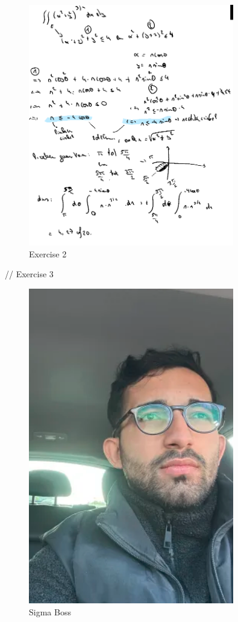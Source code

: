 \documentclass[a4paper]{article}
\begin{document}
\begin{figure}[H]
	\centering
	\includegraphics[width=0.8\textwidth]{assets/bord_5_ex_2.png}
	\caption{Exercise 2}
	\label{fig:bord_5_ex_2}
\end{figure}

// Exercise 3



\begin{figure}[h]
	\centering
	\includegraphics[width=0.8\textwidth]{assets/ilkay.png}
	\caption{Sigma Boss}
	\label{fig:ilkay}
\end{figure}
\end{document}
